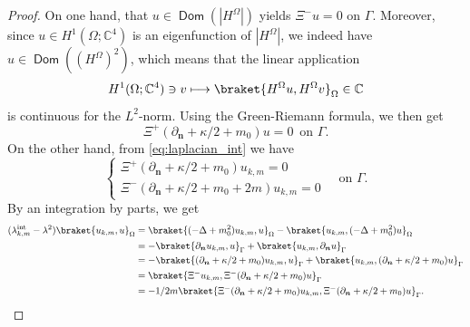 \documentclass[JEP,XML,SOM,Unicode]{cedram}
\newcommand\mto{\mathchoice{\longmapsto}{\mapsto}{\mapsto}{\mapsto}}
\newcommand{\intt}{\mathrm{int}}
\theoremstyle{plain}
\theoremstyle{definition}
\newcommand{\CC}{\mathbb{C}}
\newcommand{\bn}{{\boldsymbol n}}
\let\pa\partial
\DeclareMathOperator{\Dom}{\mathsf{Dom}}
\begin{document}
\begin{proof}
On one hand, that $u\in \Dom(|H^\Omega|)$ yields
$\Xi^- u = 0$ on $\Gamma$. Moreover, since $u\in H^1(\Omega; \CC^4)$ is an eigenfunction of $|H^\Omega|$, we indeed have $u\in \Dom((H^\Omega)^2)$, which means that the linear application
$$ H^1(\Omega; \CC^4)\ni v\mto \braket{H^\Omega u,H^\Omega v}_\Omega\in\CC$$is continuous for the $L^2$-norm. Using the Green-Riemann formula, we then get
$$\Xi^+ (\pa_\bn + \kappa/2+m_0)u = 0\,\mbox{ on }\Gamma.$$ On the other hand, from \eqref{eq:laplacian_int} we have
\[
\begin{cases}
\Xi^+ (\pa_\bn + \kappa/2+m_0)u_{k,m} = 0\\
\Xi^-(\pa_\bn + \kappa/2+m_0+2m)u_{k,m} = 0
\end{cases}\quad\mbox{on }\Gamma.
\]
By an integration by parts, we get
\begin{align*}
(\lambda_{k,m}^\intt-\lambda^2)\braket{u_{k,m},u}_{\Omega}
&= \braket{(-\Delta+m_0^2) u_{k,m},u}_\Omega - \braket{u_{k,m},(-\Delta+m_0^2) u}_\Omega
\\&= -\braket{\pa_\bn u_{k,m},u}_\Gamma +\braket{u_{k,m},\pa_\bn u}_\Gamma
\\&= -\braket{(\pa_\bn+\kappa/2+m_0) u_{k,m},u}_\Gamma +\braket{u_{k,m},(\pa_\bn + \kappa/2+m_0) u}_\Gamma
\\&= \braket{\Xi^-u_{k,m},\Xi^-(\pa_\bn + \kappa/2+m_0) u}_\Gamma
\\&= -1/2m\braket{\Xi^-(\pa_\bn + \kappa/2+m_0)u_{k,m},\Xi^-(\pa_\bn + \kappa/2+m_0) u}_\Gamma.
\end{align*}
\end{proof}
\end{document}
